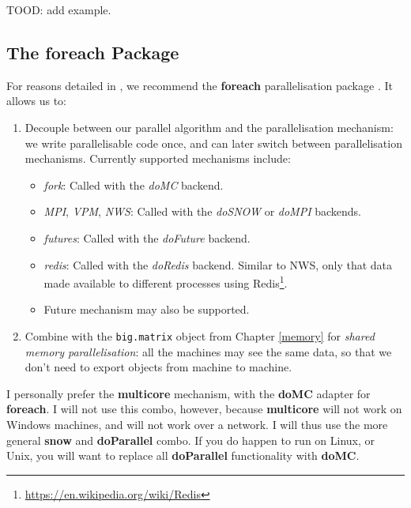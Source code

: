\documentclass[]{book}
\providecommand{\tightlist}{%
  \setlength{\itemsep}{0pt}\setlength{\parskip}{0pt}}
\renewcommand{\href}[2]{#2\footnote{\url{#1}}}
\theoremstyle{definition}
\theoremstyle{definition}
\theoremstyle{definition}
\theoremstyle{remark}
\let\BeginKnitrBlock\begin \let\EndKnitrBlock\end
\begin{document}
TOOD: add example.

\hypertarget{the-foreach-package}{%
\subsection{The foreach Package}\label{the-foreach-package}}

For reasons detailed in \citet{kane2013scalable}, we recommend the \textbf{foreach} parallelisation package \citep{foreach}.
It allows us to:

\begin{enumerate}
\def\labelenumi{\arabic{enumi}.}
\item
  Decouple between our parallel algorithm and the parallelisation mechanism: we write parallelisable code once, and can later switch between parallelisation mechanisms.
  Currently supported mechanisms include:

  \begin{itemize}
  \tightlist
  \item
    \emph{fork}: Called with the \emph{doMC} backend.
  \item
    \emph{MPI}, \emph{VPM}, \emph{NWS}: Called with the \emph{doSNOW} or \emph{doMPI} backends.
  \item
    \emph{futures}: Called with the \emph{doFuture} backend.
  \item
    \emph{redis}: Called with the \emph{doRedis} backend. Similar to NWS, only that data made available to different processes using \href{https://en.wikipedia.org/wiki/Redis}{Redis}.
  \item
    Future mechanism may also be supported.
  \end{itemize}
\item
  Combine with the \texttt{big.matrix} object from Chapter \ref{memory} for \emph{shared memory parallelisation}: all the machines may see the same data, so that we don't need to export objects from machine to machine.
\end{enumerate}

\BeginKnitrBlock{remark}
{}I personally prefer the \textbf{multicore} mechanism, with the \textbf{doMC} adapter for \textbf{foreach}.
I will not use this combo, however, because \textbf{multicore} will not work on Windows machines, and will not work over a network.
I will thus use the more general \textbf{snow} and \textbf{doParallel} combo.
If you do happen to run on Linux, or Unix, you will want to replace all \textbf{doParallel} functionality with \textbf{doMC}.
\EndKnitrBlock{remark}
\end{document}
